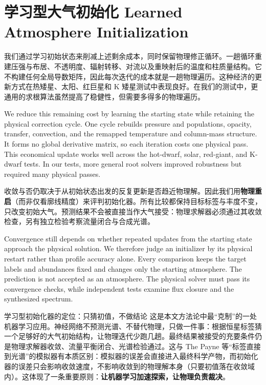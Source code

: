 \section{学习型大气初始化 Learned Atmosphere Initialization}\label{sec:atmosphere_emulator}

我们通过学习初始状态来削减上述剩余成本，同时保留物理修正循环。一趟循环重建压强与布居、不透明度、辐射转移、对流以及重映射后的温度和柱质量结构。它不构建任何全局导数矩阵，因此每次迭代的成本就是一趟物理遍历。这种经济的更新方式在热矮星、太阳、红巨星和 K 矮星测试中表现良好。在我们的测试中，更通用的求根算法虽然提高了稳健性，但需要多得多的物理遍历。

\begin{EN}
We reduce this remaining cost by learning the starting state while retaining
the physical correction cycle. One cycle
rebuilds pressure and populations, opacity, transfer, convection, and the
remapped temperature and column-mass structure. It forms no global derivative
matrix, so each iteration costs one physical pass. This economical update
works well across the hot-dwarf, solar, red-giant, and K-dwarf tests. In our
tests, more general root solvers improved robustness but required many physical
passes.
\end{EN}

收敛与否仍取决于从初始状态出发的反复更新是否趋近物理解。因此我们用\textbf{物理重启}（而非仅看廓线精度）来评判初始化器。所有比较都保持目标标签与丰度不变，只改变初始大气。预测结果不会被直接当作大气接受：物理求解器必须通过其收敛检查，另有独立检验考察流量闭合与合成光谱。

\begin{EN}
Convergence still depends on whether repeated updates from the starting state
approach the physical solution. We therefore judge an initializer by its
physical restart rather than profile accuracy alone. Every comparison keeps
the target labels and abundances fixed and changes only the starting atmosphere.
The prediction is not accepted as an atmosphere. The physical solver must pass
its convergence checks, while independent tests examine flux closure and the
synthesized spectrum.
\end{EN}

\begin{physbox}{学习型初始化器的定位：只猜初值，不做结论}
这是本文方法论中最“克制”的一处机器学习应用。神经网络不预测光谱、不替代物理，只做一件事：根据恒星标签猜一个足够好的大气初始结构，让物理迭代少跑几趟。最终结果被接受的充要条件仍是物理求解器收敛、流量平衡闭合、光谱检验通过。这与 The Payne 等“标签直接到光谱”的模拟器有本质区别：模拟器的误差会直接进入最终科学产物，而初始化器的误差只会影响收敛速度，不影响收敛到的物理解本身（只要初值落在收敛域内）。这体现了一条重要原则：\textbf{让机器学习加速探索，让物理负责裁决}。
\end{physbox}

